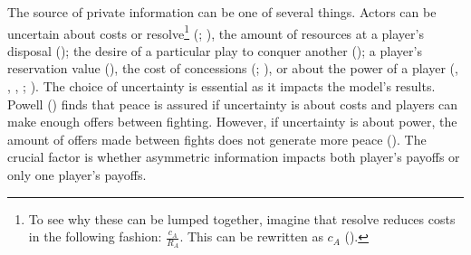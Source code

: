 \documentclass[
  12pt,
]{article}
\theoremstyle{plain}
\theoremstyle{plain}
\theoremstyle{remark}
\begin{document}
The source of private information can be one of several things. Actors
can be uncertain about costs or resolve\footnote{To see why these can be
  lumped together, imagine that resolve reduces costs in the following
  fashion: \(\frac{c_A}{R_A}\). This can be rewritten as \(c_A\)
  ().}
(; ), the amount of resources at a player's disposal
(); the desire of a particular play to conquer another
();
a player's reservation value
(), the cost of concessions
(;
), or about the
power of a player (,
,
,
;
). The choice of uncertainty is essential as it impacts
the model's results. Powell
() finds that
peace is assured if uncertainty is about costs and players can make
enough offers between fighting. However, if uncertainty is about power,
the amount of offers made between fights does not generate more peace
(). The
crucial factor is whether asymmetric information impacts both player's
payoffs or only one player's payoffs.
\end{document}
